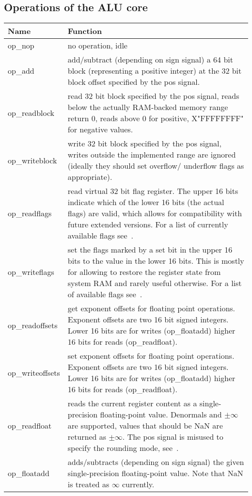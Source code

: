 \subsection{Operations of the ALU core}
\label{sec:aluops}
\renewcommand\tabline[2]{#1 & #2\\ \hline}
\begin{center}
\begin{tabular}{|l|p{}|}
\hline
\tabline {Name}  {Function}
\hline
\tabline {op\_nop} {no operation, idle}
\tabline {op\_add} {
    add/subtract (depending on sign signal) a 64 bit block
    (representing a positive integer) at the 32 bit block offset
    specified by the pos signal.}
\tabline {op\_readblock} {
    read 32 bit block specified by the pos signal, reads
    below the actually RAM-backed memory range return 0,
    reads above 0 for positive, X"FFFFFFFF" for negative values.}
\tabline {op\_writeblock} {
    write 32 bit block specified by the pos signal, writes outside
    the implemented range are ignored (ideally they should set overflow/
    underflow flags as appropriate).}
\tabline {op\_readflags} {
    read virtual 32 bit flag register. The upper 16 bits indicate
    which of the lower 16 bits (the actual flags) are valid, which
    allows for compatibility with future extended versions.
    For a list of currently available flags see~\fref{tab:flags}.}
\tabline {op\_writeflags} {
    set the flags marked by a set bit in the upper 16 bits to
    the value in the lower 16 bits.
    This is mostly for allowing to restore the register state from system
    RAM and rarely useful otherwise.
    For a list of available flags see~\fref{tab:flags}.}
\tabline {op\_readoffsets} {
    get exponent offsets for floating point operations.
    Exponent offsets are two 16 bit signed integers.
    Lower 16 bits are for writes (op\_floatadd) higher 16 bits for reads (op\_readfloat).}
\tabline {op\_writeoffsets} {
    set exponent offsets for floating point operations.
    Exponent offsets are two 16 bit signed integers.
    Lower 16 bits are for writes (op\_floatadd) higher 16 bits for reads (op\_readfloat).}
\tabline {op\_readfloat} {
    reads the current register content as a single-precision
    floating-point value. Denormals and $\pm\infty$ are supported, values that should
    be NaN are returned as $\pm\infty$.
    The pos signal is misused to specify the rounding mode, see~\fref{tab:round}.}
\tabline {op\_floatadd} {
    adds/subtracts (depending on sign signal) the given
    single-precision floating-point value. Note that NaN is treated as $\infty$
    currently.}
\end{tabular}
\end{center}

